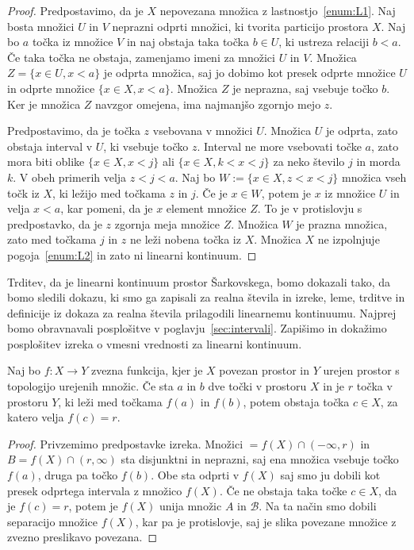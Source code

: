 \documentclass[../TG_magistrsko_delo_sections.tex]{subfiles}
\begin{document}
\begin{proof}
Predpostavimo, da je $X$ nepovezana množica z lastnostjo~\ref{enum:L1}. Naj bosta množici $U$ in $V$ neprazni odprti množici, ki tvorita particijo prostora $X$. Naj bo $a$ točka iz množice $V$ in naj obstaja taka točka $b \in U$, ki ustreza relaciji $b<a$. Če taka točka ne obstaja, zamenjamo imeni za množici $U$ in $V$. Množica $Z = \{x \in U, x<a\}$ je odprta množica, saj jo dobimo kot presek odprte množice $U$ in odprte množice $\{x \in X, x<a\}$. Množica $Z$ je neprazna, saj vsebuje točko $b$. Ker je množica $Z$ navzgor omejena, ima najmanjšo zgornjo mejo $z$.

Predpostavimo, da je točka $z$ vsebovana v množici $U$. Množica $U$ je odprta, zato obstaja interval v $U$, ki vsebuje točko $z$. Interval ne more vsebovati točke $a$, zato mora biti oblike $\{x \in X, x<j\}$ ali $\{x \in X, k<x<j\}$ za neko število $j$ in morda $k$. V obeh primerih velja $z<j<a$. Naj bo $W:=\{x \in X, z<x<j\}$ množica vseh točk iz $X$, ki ležijo med točkama $z$ in $j$. Če je $x \in W$, potem je $x$ iz množice $U$ in velja $x<a$, kar pomeni, da je $x$ element množice $Z$. To je v protislovju s predpostavko, da je $z$ zgornja meja množice $Z$. Množica $W$ je prazna množica, zato med točkama $j$ in $z$ ne leži nobena točka iz $X$. Množica $X$ ne izpolnjuje pogoja~\ref{enum:L2} in zato ni linearni kontinuum.
\end{proof}

Trditev, da je linearni kontinuum prostor Šarkovskega, bomo dokazali tako, da bomo sledili dokazu, ki smo ga zapisali za realna števila in izreke, leme, trditve in definicije iz dokaza za realna števila prilagodili linearnemu kontinuumu. Najprej bomo obravnavali posplošitve v poglavju~\ref{sec:intervali}. Zapišimo in dokažimo posplošitev izreka o vmesni vrednosti za linearni kontinuum.

\begin{izrek}
Naj bo $f : X \to Y$ zvezna funkcija, kjer je $X$ povezan prostor in $Y$ urejen prostor s topologijo urejenih množic. Če sta $a$ in $b$ dve točki v prostoru $X$ in je $r$ točka v prostoru $Y$, ki leži med točkama $f(a)$ in $f(b)$, potem obstaja točka $c \in X$, za katero velja $f(c) = r$.
\end{izrek}
\begin{proof}
Privzemimo predpostavke izreka. Množici $=f(X) \cap (-\infty, r)$ in $B=f(X) \cap (r, \infty)$ sta disjunktni in neprazni, saj ena množica vsebuje točko $f(a)$, druga pa točko $f(b)$. Obe sta odprti v $f(X)$ saj smo ju dobili kot presek odprtega intervala z množico $f(X)$. Če ne obstaja taka točke $c \in X$, da je $f(c) = r$, potem je $f(X)$ unija množic $A$ in $\mathcal{B}$. Na ta način smo dobili separacijo množice $f(X)$, kar pa je protislovje, saj je slika povezane množice z zvezno preslikavo povezana.
\end{proof}
\end{document}
